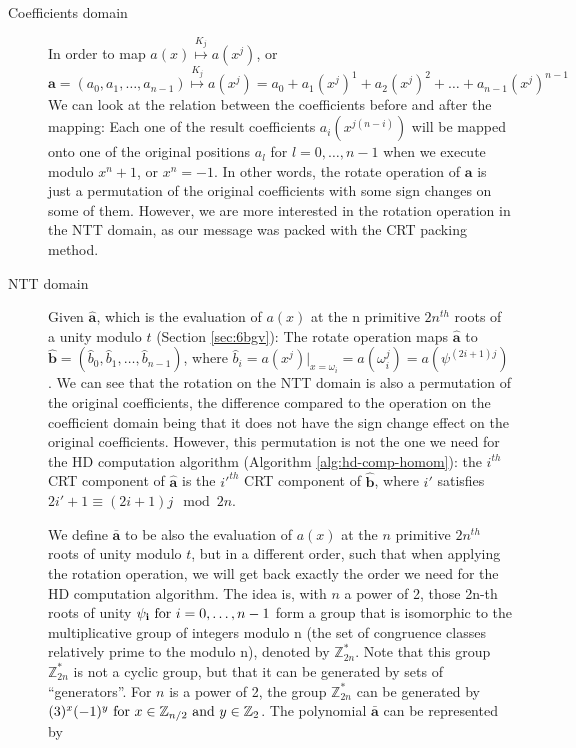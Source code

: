 \begin{description}
\item[Coefficients domain] In order to map
  \(a(x) \stackrel{K_{j}}{\mapsto} a(x^{j})\), or
  \[\mathbf{a} = (a_{0}, a_{1}, \dots, a_{n-1}) \stackrel{K_{j}}{\mapsto} a(x^{j}) = a_{0} + a_{1}(x^{j})^{1} + a_{2}(x^{j})^{2} + \dots + a_{n-1}(x^{j})^{n-1}\]
  We can look at the relation between the coefficients before and after the
  mapping: Each one of the result coefficients \(a_{i}(x^{j(n-i)})\) will be
  mapped onto one of the original positions \(a_{l}\) for \(l = 0,\dots,n-1\) when
  we execute modulo \(x^{n} + 1\), or \(x^{n} = -1\). In other words, the rotate
  operation of \(\mathbf{a}\) is just a permutation of the original coefficients
  with some sign changes on some of them. However, we are more interested
  in the rotation operation in the NTT domain, as our message was packed with the CRT
  packing method.
\item[NTT domain] Given \(\mathbf{\hat{a}}\), which is the evaluation of
  \(a(x)\) at the n primitive \(2n^{th}\) roots of a unity modulo \(t\) (Section
  \ref{sec:6bgv}):
  The rotate operation maps \(\mathbf{\hat{a}}\) to
  \(\mathbf{\hat{b}} = (\hat{b}_{0}, \hat{b}_{1}, \dots, \hat{b}_{n-1})\), where
  \(\hat{b}_{i} = a(x^{j})|_{x = \omega_{i}} = a(\omega_{i}^{j}) =
  a(\psi^{(2i+1)j})\). We can see that the rotation on the NTT domain is also a
  permutation of the original coefficients, the difference compared to the
  operation on the coefficient domain being that it does not have the sign change
  effect on the original coefficients. However, this permutation is not the one
  we need for the HD computation algorithm (Algorithm \ref{alg:hd-comp-homom}):
  the \(i^{th}\) CRT component of \(\mathbf{\hat{a}}\) is the \(i'^{th}\) CRT
  component of \(\mathbf{\hat{b}}\), where \(i'\) satisfies
  \(2i' +1 \equiv (2i + 1)j \mod 2n\).

  We define \(\mathbf{\bar{a}}\) to be also the evaluation of \(a(x)\) at the
  \(n\) primitive \(2n^{th}\) roots of unity modulo \(t\), but in a different
  order, such that when applying the rotation operation, we will get back
  exactly the order we need for the HD computation algorithm. The idea is, with
  \(n\) a power of 2, those 2n-th roots of unity
  \(\mathbf{\psi_{i}} \textnormal{ for } i = 0, \dots, n-1\) form a group that
  is isomorphic to the multiplicative group of integers modulo n (the set of
  congruence classes relatively prime to the modulo n), denoted by
  \(\mathbb{Z}_{2n}^{*}\). Note that this group \(\mathbb{Z}_{2n}^{*}\) is not a cyclic group, but that it can
  be generated by sets of ``generators''. For \(n\) is a power of 2, the group
  \(\mathbb{Z}_{2n}^{*}\) can be generated by
  \((3)^{x}(-1)^{y} \textnormal{ for } x \in \mathbb{Z}_{n/2} \textnormal{ and } y
  \in \mathbb{Z}_{2}\). The polynomial \(\mathbf{\bar{a}}\) can be represented by


\end{description}
